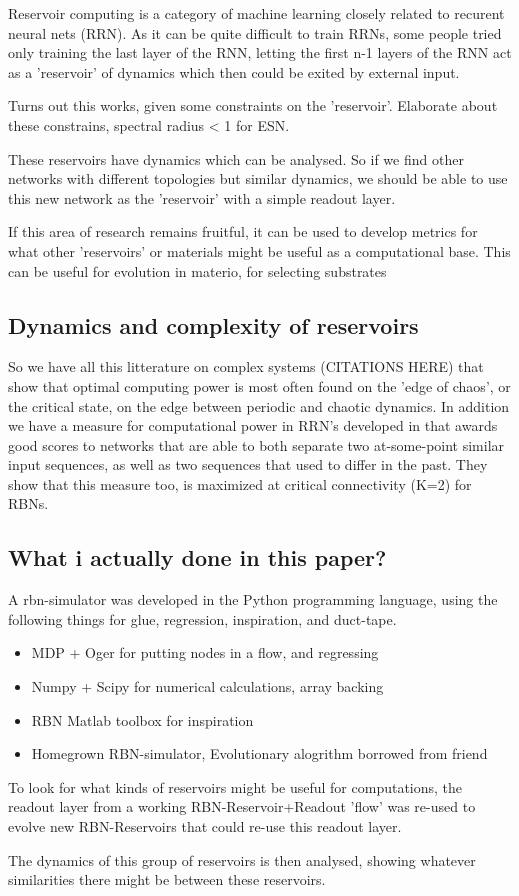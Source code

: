 Reservoir computing is a category of machine learning closely related to recurent neural nets (RRN).
As it can be quite difficult to train RRNs, some people \cite{liquidstatepaper} \cite{echostatenetworkpaper} tried only training the last layer of the RNN,
letting the first n-1 layers of the RNN act as a 'reservoir' of dynamics which then could be exited by external input.

Turns out this works, given some constraints on the 'reservoir'.
Elaborate about these constrains, spectral radius < 1 for ESN.

These reservoirs have dynamics which can be analysed.
So if we find other networks with different topologies but similar dynamics,
we should be able to use this new network as the 'reservoir' with a simple readout layer.

If this area of research remains fruitful, it can be used to develop metrics for what other 'reservoirs' or materials might be useful as a  computational base.
This can be useful for evolution in materio, for selecting substrates \cite{evolutionInMaterio}


\subsection{Dynamics and complexity of reservoirs}

So we have all this litterature on complex systems (CITATIONS HERE) that show that optimal computing power is most often found on the 'edge of chaos', or the critical state, on the edge between periodic and chaotic dynamics.
In addition we have a measure for computational power in RRN's developed in \cite{rbn-reservoir} that awards good scores to networks that are able to both separate two at-some-point similar input sequences, as well as two sequences that used to differ in the past.
They show that this measure too, is maximized at critical connectivity (K=2) for RBNs.

\subsection{What i actually done in this paper?}

A rbn-simulator was developed in the Python programming language,
using the following things for glue, regression, inspiration, and duct-tape.

\begin{itemize}
  \item MDP + Oger for putting nodes in a flow, and regressing
  \item Numpy + Scipy for numerical calculations, array backing
  \item RBN Matlab toolbox for inspiration
  \item Homegrown RBN-simulator, Evolutionary alogrithm borrowed from friend
\end{itemize}

To look for what kinds of reservoirs might be useful for computations,
the readout layer from a working RBN-Reservoir+Readout 'flow' was re-used to evolve new RBN-Reservoirs that could re-use this readout layer.

The dynamics of this group of reservoirs is then analysed,
showing whatever similarities there might be between these reservoirs.
